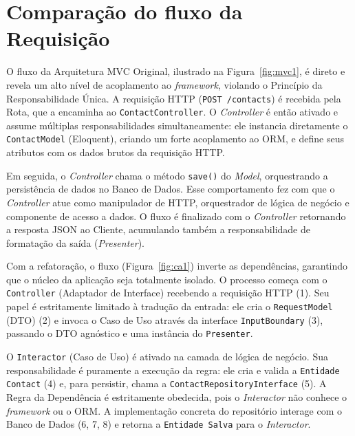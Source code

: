 \section{Comparação do fluxo da Requisição}

    \par O fluxo da Arquitetura MVC Original, ilustrado na Figura~\ref{fig:mvc1}, é direto e revela um alto nível de acoplamento ao \textit{framework}, violando o Princípio da Responsabilidade Única. A requisição HTTP (\texttt{POST /contacts}) é recebida pela Rota, que a encaminha ao \texttt{ContactController}. O \textit{Controller} é então ativado e assume múltiplas responsabilidades simultaneamente: ele instancia diretamente o \texttt{ContactModel} (Eloquent), criando um forte acoplamento ao ORM, e define seus atributos com os dados brutos da requisição HTTP. 
    
    \par Em seguida, o \textit{Controller} chama o método \texttt{save()} do \textit{Model}, orquestrando a persistência de dados no Banco de Dados. Esse comportamento fez com que o \textit{Controller} atue como manipulador de HTTP, orquestrador de lógica de negócio e componente de acesso a dados. O fluxo é finalizado com o \textit{Controller} retornando a resposta JSON ao Cliente, acumulando também a responsabilidade de formatação da saída (\textit{Presenter}).

    \par Com a refatoração, o fluxo (Figura~\ref{fig:ca1}) inverte as dependências, garantindo que o núcleo da aplicação seja totalmente isolado. O processo começa com o \texttt{Controller} (Adaptador de Interface) recebendo a requisição HTTP (1). Seu papel é estritamente limitado à tradução da entrada: ele cria o \texttt{RequestModel} (DTO) (2) e invoca o Caso de Uso através da interface \texttt{InputBoundary} (3), passando o DTO agnóstico e uma instância do \texttt{Presenter}.

    \par O \texttt{Interactor} (Caso de Uso) é ativado na camada de lógica de negócio. Sua responsabilidade é puramente a execução da regra: ele cria e valida a \texttt{Entidade Contact} (4) e, para persistir, chama a \texttt{ContactRepositoryInterface} (5). A Regra da Dependência é estritamente obedecida, pois o \textit{Interactor} não conhece o \textit{framework} ou o ORM. A implementação concreta do repositório interage com o Banco de Dados (6, 7, 8) e retorna a \texttt{Entidade Salva} para o \textit{Interactor}.

